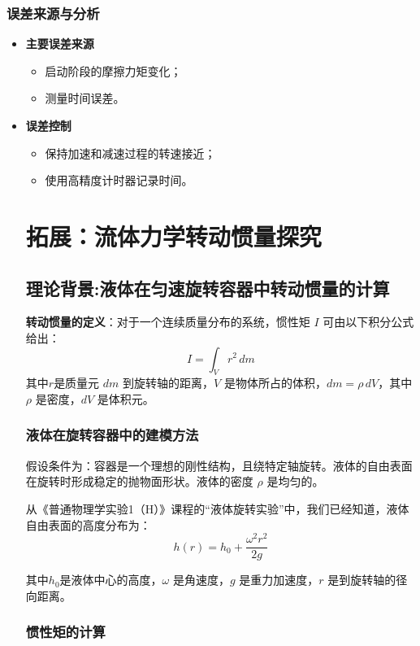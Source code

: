 \documentclass[12pt,hyperref,a4paper,UTF8]{ctexart}
\begin{document}
\subsubsection{误差来源与分析}
    \begin{itemize}
        \item \textbf{主要误差来源}
        \begin{itemize}
            \item 启动阶段的摩擦力矩变化；
            \item 测量时间误差。
        \end{itemize}
        \item \textbf{误差控制}
        \begin{itemize}
            \item 保持加速和减速过程的转速接近；
            \item 使用高精度计时器记录时间。
        \end{itemize}

\section{拓展：流体力学转动惯量探究}
        \subsection{理论背景:液体在匀速旋转容器中转动惯量的计算}
        \textbf{转动惯量的定义}：对于一个连续质量分布的系统，惯性矩 $I$ 可由以下积分公式给出：  
        $$
        I = \int_V r^2 \,dm
        $$  
        其中$r$是质量元 $dm$ 到旋转轴的距离，$V$ 是物体所占的体积，$dm = \rho \, dV$，其中 $\rho$ 是密度，$dV$ 是体积元。
        
        \subsubsection{液体在旋转容器中的建模方法}
        
        假设条件为：容器是一个理想的刚性结构，且绕特定轴旋转。液体的自由表面在旋转时形成稳定的抛物面形状。液体的密度 $\rho$ 是均匀的。
        
        从《普通物理学实验1（H）》课程的“液体旋转实验”中，我们已经知道，液体自由表面的高度分布为： 
        $$
        h(r) = h_0 + \frac{\omega^2 r^2}{2g}
        $$  
        
        其中$h_0$是液体中心的高度，$\omega$ 是角速度，$g$ 是重力加速度，$r$ 是到旋转轴的径向距离。
        
        \subsubsection{惯性矩的计算}
        

\end{itemize}
\end{document}
